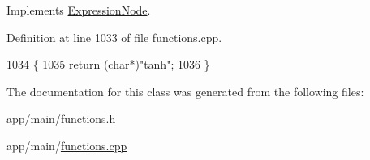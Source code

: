 Implements \hyperlink{classExpressionNode_a42a5e9562b0f645a19dcc83f698069b5}{Expression\+Node}.



Definition at line 1033 of file functions.\+cpp.


\begin{DoxyCode}
1034 \{
1035     \textcolor{keywordflow}{return} (\textcolor{keywordtype}{char}*)\textcolor{stringliteral}{"tanh"};
1036 \}
\end{DoxyCode}


The documentation for this class was generated from the following files\+:\begin{DoxyCompactItemize}
\item 
app/main/\hyperlink{functions_8h}{functions.\+h}\item 
app/main/\hyperlink{functions_8cpp}{functions.\+cpp}\end{DoxyCompactItemize}
